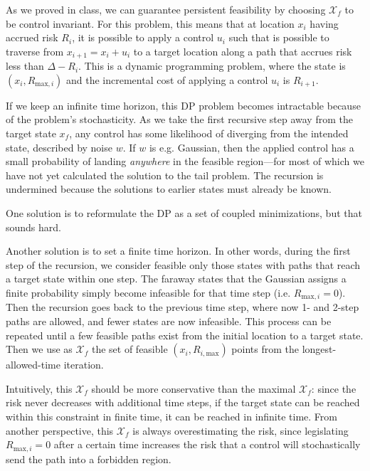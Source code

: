 \documentclass[11pt]{article}
\newcommand{\X}{\mathcal{X}}
\newcommand{\Rmaxsub}[1]{R_{\mathrm{max}, i}}
\begin{document}
As we proved in class, we can guarantee persistent feasibility by choosing \(\X_f\) to be control invariant. For this problem, this means that at location \(x_i\) having accrued risk \(R_i\), it is possible to apply a control \(u_i\) such that is possible to traverse from \(x_{i + 1} = x_i + u_i\) to a target location along a path that accrues risk less than \(\Delta - R_i\). This is a dynamic programming problem, where the state is \((x_i, \Rmaxsub{i})\) and the incremental cost of applying a control \(u_i\) is \(R_{i + 1}\).

If we keep an infinite time horizon, this DP problem becomes intractable because of the problem's stochasticity. As we take the first recursive step away from the target state \(x_f\), any control has some likelihood of diverging from the intended state, described by noise \(w\). If \(w\) is e.g. Gaussian, then the applied control has a small probability of landing \emph{anywhere} in the feasible region---for most of which we have not yet calculated the solution to the tail problem. The recursion is undermined because the solutions to earlier states must already be known.

One solution is to reformulate the DP as a set of coupled minimizations, but that sounds hard.

Another solution is to set a finite time horizon. In other words, during the first step of the recursion, we consider feasible only those states with paths that reach a target state within one step. The faraway states that the Gaussian assigns a finite probability simply become infeasible for that time step (i.e. \(\Rmaxsub{i} = 0\)). Then the recursion goes back to the previous time step, where now 1- and 2-step paths are allowed, and fewer states are now infeasible. This process can be repeated until a few feasible paths exist from the initial location to a target state. Then we use as \(\X_f\) the set of feasible \((x_i, R_{i, \mathrm{max}})\) points from the longest-allowed-time iteration.

Intuitively, this \(\X_f\) should be more conservative than the maximal \(\X_f\): since the risk never decreases with additional time steps, if the target state can be reached within this constraint in finite time, it can be reached in infinite time. From another perspective, this \(\X_f\) is always overestimating the risk, since legislating \(\Rmaxsub{i} = 0\) after a certain time increases the risk that a control will stochastically send the path into a forbidden region.



\end{document}

